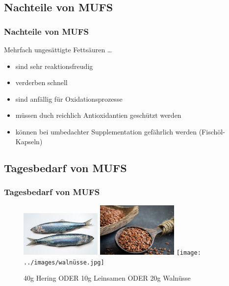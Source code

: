 \documentclass[xcolor=dvipsnames]{beamer}
\begin{document}
    \subsection{Nachteile von MUFS}
    \begin{frame}
        \frametitle{Nachteile von MUFS}

        \begin{block}{Mehrfach ungesättigte Fettsäuren \ldots}
            \begin{itemize}
                \setlength\itemsep{1em}
                \item sind sehr reaktionsfreudig
                \item verderben schnell
                \item sind anfällig für Oxidationsprozesse
                \item müssen duch reichlich Antioxidantien geschützt werden
                \item können bei umbedachter Supplementation gefährlich werden (Fischöl-Kapseln)
            \end{itemize}
        \end{block}
    \end{frame}

    \subsection{Tagesbedarf von MUFS}
    \begin{frame}
        \frametitle{Tagesbedarf von MUFS}

        \begin{figure}
            \centering
            \includegraphics[width=4cm]{../images/hering.jpg}
            \includegraphics[width=4cm]{../images/leinsamen.jpg}
            \texttt{[image: ../images/walnüsse.jpg]}
            \caption{40g Hering ODER 10g Leinsamen ODER 20g Walnüsse}
        \end{figure}
    \end{frame}
\end{document}
